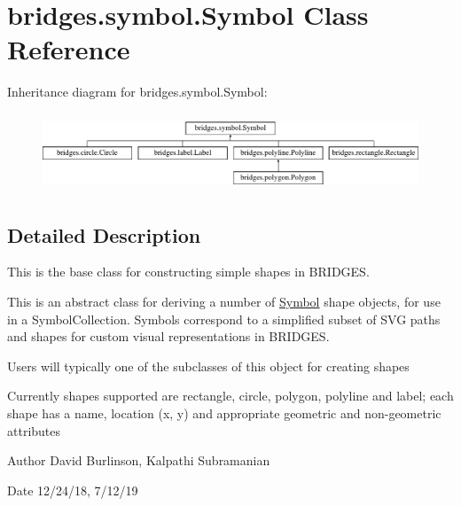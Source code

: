 \hypertarget{classbridges_1_1symbol_1_1_symbol}{}\section{bridges.\+symbol.\+Symbol Class Reference}
\label{classbridges_1_1symbol_1_1_symbol}
Inheritance diagram for bridges.\+symbol.\+Symbol\+:\begin{figure}[H]
\begin{center}
\leavevmode
\includegraphics[height=2.346369cm]{classbridges_1_1symbol_1_1_symbol}
\end{center}
\end{figure}


\subsection{Detailed Description}
This is the base class for constructing simple shapes in B\+R\+I\+D\+G\+ES. 

This is an abstract class for deriving a number of \hyperlink{classbridges_1_1symbol_1_1_symbol}{Symbol} shape objects, for use in a Symbol\+Collection. Symbols correspond to a simplified subset of S\+VG paths and shapes for custom visual representations in B\+R\+I\+D\+G\+ES.

Users will typically one of the subclasses of this object for creating shapes

Currently shapes supported are rectangle, circle, polygon, polyline and label; each shape has a name, location (x, y) and appropriate geometric and non-\/geometric attributes

\begin{DoxyAuthor}{Author}
David Burlinson, Kalpathi Subramanian 
\end{DoxyAuthor}
\begin{DoxyDate}{Date}
12/24/18, 7/12/19 
\end{DoxyDate}
